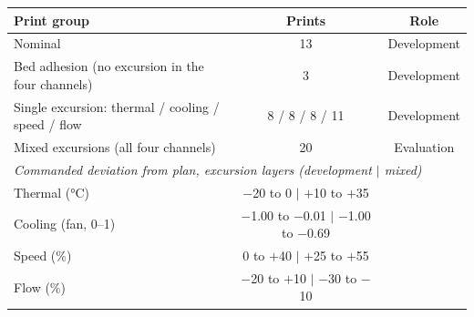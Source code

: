 \begin{tabular}{lcc}
\toprule
Print group & Prints & Role \\
\midrule
Nominal & 13 & Development \\
Bed adhesion (no excursion in the four channels) & 3 & Development \\
Single excursion: thermal / cooling / speed / flow & 8 / 8 / 8 / 11 & Development \\
Mixed excursions (all four channels) & 20 & Evaluation \\
\midrule
\multicolumn{3}{l}{\textit{Commanded deviation from plan, excursion layers (development $|$ mixed)}}\\
Thermal (\si{\celsius}) & $-$20 to 0 $|$ $+$10 to $+$35 &  \\
Cooling (fan, 0--1) & $-$1.00 to $-$0.01 $|$ $-$1.00 to $-$0.69 &  \\
Speed (\%) & 0 to $+$40 $|$ $+$25 to $+$55 &  \\
Flow (\%) & $-$20 to $+$10 $|$ $-$30 to $-$10 &  \\
\bottomrule
\end{tabular}
